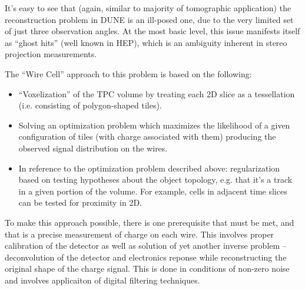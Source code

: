 It's easy to see that (again, similar to majority of tomographic application) the reconstruction problem in DUNE is an ill-posed one,
due to the very limited set of just three observation angles. At the most basic level, this issue
manifests itself as ``ghost hits'' (well known in HEP), which is an ambiguity inherent in stereo
projection measurements.

The ``Wire Cell'' approach to this problem is based on the following:
\begin{itemize}
\item ``Voxelization'' of the TPC volume by treating each 2D slice as a tessellation (i.e. consisting of polygon-shaped tiles).

\item Solving an optimization problem which maximizes the likelihood of a given configuration of tiles (with charge associated with them) producing the observed signal distribution on the wires.

\item In reference to the optimization problem described above: regularization based on testing hypotheses about the object topology, e.g. that it's a track in a given portion of the volume. For example, cells in adjacent time slices can be tested for proximity in 2D.
\end{itemize}

To make this approach possible, there is one prerequisite that must be met, and that is a precise measurement of charge on each wire. This involves
proper calibration of the detector as well as solution of yet another inverse problem -- deconvolution of the detector and electronics reponse while
reconstructing the original shape of the charge signal. This is done in conditions of non-zero noise and involves applicaiton of digital filtering techniques.

